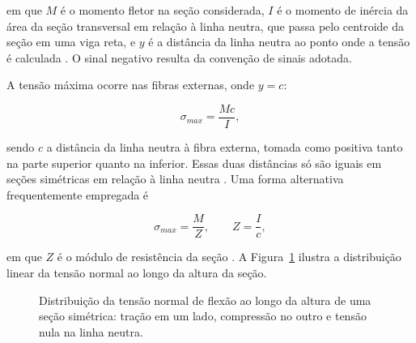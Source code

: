 \documentclass[arial,centeredequations,english,brazilian,oneside,section=TITLE]{ifes8}
\begin{document}
em que $M$ é o momento fletor na seção considerada, $I$ é o momento de inércia da área
da seção transversal em relação à linha neutra, que passa pelo centroide da seção
em uma viga reta, e $y$ é a distância da linha neutra ao ponto onde a tensão é
calculada \cite{Norton2013}. O sinal negativo resulta da convenção de sinais
adotada.

A tensão máxima ocorre nas fibras externas, onde $y = c$:

\begin{equation}
  \label{eq:sigma-max}
  \sigma_{max} = \frac{M c}{I},
\end{equation}

sendo $c$ a distância da linha neutra à fibra externa, tomada como positiva tanto
na parte superior quanto na inferior. Essas duas distâncias só são iguais em seções
simétricas em relação à linha neutra \cite{Norton2013}. Uma forma alternativa
frequentemente empregada é

\begin{equation}
  \label{eq:sigma-Z}
  \sigma_{max} = \frac{M}{Z}, \qquad Z = \frac{I}{c},
\end{equation}

em que $Z$ é o módulo de resistência da seção \cite{Norton2013}. A
Figura~\ref{fig:distribuicao-tensao} ilustra a distribuição linear da tensão normal ao
longo da altura da seção.

\begin{figure}[h]
  \centering
  \caption{Distribuição da tensão normal de flexão ao longo da altura de uma seção
    simétrica: tração em um lado, compressão no outro e tensão nula na linha neutra.}
  \label{fig:distribuicao-tensao}
\end{figure}
\end{document}
